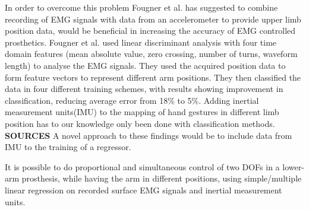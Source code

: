 In order to overcome this problem Fougner et al. \cite{Fougner2011} has suggested to combine recording of EMG signals with data from an accelerometer to provide upper limb position data, would be beneficial in increasing the accuracy of EMG controlled prosthetics. Fougner et al. used linear discriminant analysis with four time domain features (mean absolute value, zero crossing, number of turns, waveform length) to analyse the EMG signals. They used the acquired position data to form feature vectors to represent different arm positions. They then classified the data in four different training schemes, with results showing improvement in classification, reducing average error from 18\% to 5\%. \cite{Fougner2011} Adding inertial measurement units(IMU) to the mapping of hand gestures in different limb position has to our knowledge only been done with classification methods. \textbf{SOURCES} A novel approach to these findings would be to include data from IMU to the training of a regressor. 

It is possible to do proportional and simultaneous control of two DOFs in a lower-arm prosthesis, while having the arm in different positions, using simple/multiple linear regression on recorded surface EMG signals and inertial measurement units. %



